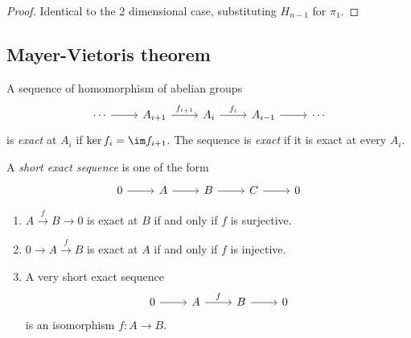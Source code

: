 \documentclass[a4paper]{article}
\begin{document}
\begin{proof}
  Identical to the 2 dimensional case, substituting \(H_{n - 1}\) for \(\pi_1\).
\end{proof}

\subsection{Mayer-Vietoris theorem}

\begin{definition}
  A sequence of homomorphism of abelian groups
  \[
    \begin{tikzcd}
      \cdots \ar[r] & A_{i + 1} \ar[r, "f_{i + 1}"] & A_i \ar[r, "f_i"] & A_{i - 1} \ar[r] & \cdots
    \end{tikzcd}
  \]
  is \emph{exact} at \(A_i\) if \(\ker f_i = \im f_{i + 1}\). The sequence is \emph{exact} if it is exact at every \(A_i\).

  A \emph{short exact sequence} is one of the form
  \[
    \begin{tikzcd}
      0 \ar[r] & A \ar[r] & B \ar[r] & C \ar[r] & 0
    \end{tikzcd}
  \]
\end{definition}

\begin{eg}\leavevmode
  \begin{enumerate}
  \item \(A \xrightarrow{f} B \to 0\) is exact at \(B\) if and only if \(f\) is surjective.
  \item \(0 \to A \xrightarrow{f} B\) is exact at \(A\) if and only if \(f\) is injective.
  \item A very short exact sequence
    \[
      \begin{tikzcd}
        0 \ar[r] & A \ar[r, "f"] & B \ar[r] & 0
      \end{tikzcd}
    \]
    is an isomorphism \(f: A \to B\).
  \end{enumerate}
\end{eg}
\end{document}
